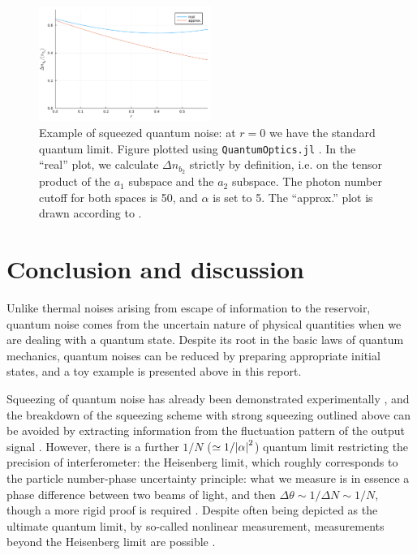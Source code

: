 \documentclass[hyperref, a4paper]{article}
\begin{document}
\begin{figure}
    \centering
    \includegraphics[width=0.5\textwidth]{plots/squeezing-error-measure-cutoff-50-phi-pi-10-alpha-5.pdf}
    \caption{Example of squeezed quantum noise: at $r = 0$ we have the standard quantum limit.
    Figure plotted using \texttt{QuantumOptics.jl} \cite{kramer2018quantumoptics}.
    In the ``real'' plot, 
    we calculate $\Delta n_{b_2}$ strictly by definition, 
    i.e. on the tensor product of the $a_1$ subspace and the $a_2$ subspace.
    The photon number cutoff for both spaces is 50,
    and $\alpha$ is set to 5.
    The ``approx.'' plot is drawn according to .
    }
    \label{fig:squeezing}
\end{figure}

\section{Conclusion and discussion}

Unlike thermal noises arising from escape of information to the reservoir, 
quantum noise comes from the uncertain nature of physical quantities 
when we are dealing with a quantum state.
Despite its root in the basic laws of quantum mechanics,
quantum noises can be reduced by preparing appropriate initial states,
and a toy example is presented above in this report.

Squeezing of quantum noise has already been demonstrated experimentally \cite{xiao_precision_1987},
and the breakdown of the squeezing scheme with strong squeezing outlined above 
can be avoided by extracting information from the fluctuation pattern of the output signal 
\cite{pezze_mach-zehnder_2008}. 
However, there is a further $1 / N$ ($\simeq 1 / \abs{\alpha}^2$) 
quantum limit restricting the precision of interferometer:
the Heisenberg limit,
which roughly corresponds to the particle number-phase uncertainty principle:
what we measure is in essence a phase difference 
between two beams of light,
and then $\Delta \theta \sim 1 / \Delta N \sim 1 / N$,
though a more rigid proof is required \cite{giovannetti_quantum_2006}.
Despite often being depicted as the ultimate quantum limit,
by so-called nonlinear measurement, measurements beyond the Heisenberg limit are possible 
\cite{boixo2008quantum,napolitano_interaction-based_2011}.

\printbibliography
\end{document}
